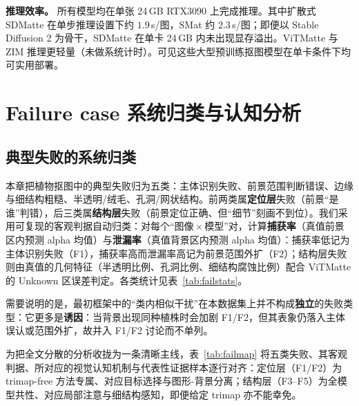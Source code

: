 \documentclass[supercite]{HustGraduPaper}
\begin{document}
	\textbf{推理效率。} 所有模型均在单张 24\,GB RTX3090 上完成推理。其中扩散式 SDMatte 在单步推理设置下约 $1.9$\,s/图，SMat 约 $2.3$\,s/图；即便以 Stable Diffusion 2 为骨干，SDMatte 在单卡 24\,GB 内未出现显存溢出。ViTMatte 与 ZIM 推理更轻量（未做系统计时）。可见这些大型预训练抠图模型在单卡条件下均可实用部署。

	

	\section{Failure case 系统归类与认知分析}
    \subsection{典型失败的系统归类}
	本章把植物抠图中的典型失败归为五类：主体识别失败、前景范围判断错误、边缘与细结构粗糙、半透明/绒毛、孔洞/网状结构。前两类属\textbf{定位层}失败（前景“是谁”判错），后三类属\textbf{结构层}失败（前景定位正确、但“细节”刻画不到位）。我们采用可复现的客观判据自动归类：对每个“图像\,$\times$\,模型”对，计算\textbf{捕获率}（真值前景区内预测 alpha 均值）与\textbf{泄漏率}（真值背景区内预测 alpha 均值）：捕获率低记为主体识别失败（F1），捕获率高而泄漏率高记为前景范围外扩（F2）；结构层失败则由真值的几何特征（半透明比例、孔洞比例、细结构腐蚀比例）配合 ViTMatte 的 Unknown 区误差判定。各类统计见表~\ref{tab:failstats}。

	需要说明的是，最初框架中的“类内相似干扰”在本数据集上并不构成\textbf{独立}的失败类型：它更多是\textbf{诱因}：当背景出现同种植株时会加剧 F1/F2，但其表象仍落入主体误认或范围外扩，故并入 F1/F2 讨论而不单列。

	为把全文分散的分析收拢为一条清晰主线，表~\ref{tab:failmap} 将五类失败、其客观判据、所对应的视觉认知机制与代表性证据样本逐行对齐：定位层（F1/F2）为 trimap-free 方法专属、对应目标选择与图形-背景分离；结构层（F3--F5）为全模型共性、对应局部注意与细结构感知，即便给定 trimap 亦不能幸免。
\end{document}
